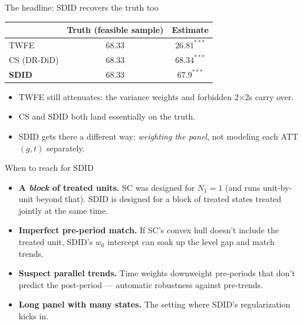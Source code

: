 \documentclass[aspectratio=169,11pt]{beamer}
\begin{document}
\begin{frame}{The headline: SDID recovers the truth too}
\vspace{0.8em}
\begin{center}\large
\begin{tabular}{lcc}
\toprule
& \textbf{Truth (feasible sample)} & \textbf{Estimate} \\
\midrule
TWFE & $68.33$ & $26.81^{\ast\ast\ast}$ \\
CS (DR-DiD) & $68.33$ & $68.34^{\ast\ast\ast}$ \\
\textbf{SDID} & $68.33$ & $\mathbf{67.9}^{\ast\ast\ast}$ \\
\bottomrule
\end{tabular}
\end{center}

\vspace{0.8em}
\begin{itemize}\small
  \item TWFE still attenuates: the variance weights and forbidden 2$\times$2s carry over.
  \item CS and SDID both land essentially on the truth.
  \item SDID gets there a different way: \textit{weighting the panel}, not modeling each ATT$(g,t)$ separately.
\end{itemize}
\end{frame}


\begin{frame}{When to reach for SDID}
\vspace{0.5em}
\begin{itemize}
  \item \textbf{A \textit{block} of treated units.} \;SC was designed for $N_1 = 1$ (and runs unit-by-unit beyond that). \;SDID is designed for a block of treated states treated jointly at the same time.
  \vspace{0.3em}
  \item \textbf{Imperfect pre-period match.} \;If SC's convex hull doesn't include the treated unit, SDID's $w_0$ intercept can soak up the level gap and match trends.
  \vspace{0.3em}
  \item \textbf{Suspect parallel trends.} \;Time weights downweight pre-periods that don't predict the post-period --- automatic robustness against pre-trends.
  \vspace{0.3em}
  \item \textbf{Long panel with many states.} \;The setting where SDID's regularization kicks in.
\end{itemize}
\end{frame}
\end{document}
